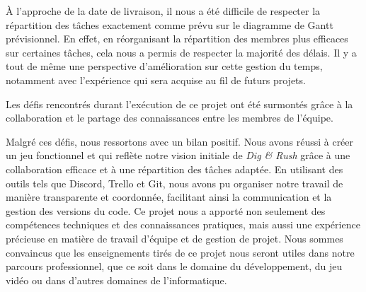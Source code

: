 \documentclass[a4paper,12pt]{article}
\begin{document}
À l’approche de la date de livraison, il nous a été diﬀicile de respecter la répartition des tâches exactement comme prévu sur le diagramme de Gantt prévisionnel.
En effet, en réorganisant la répartition des membres plus eﬀicaces sur certaines tâches, cela nous a permis de respecter la majorité des délais. Il y a tout de même une perspective d’amélioration sur cette gestion du temps, notamment avec l’expérience qui sera acquise au fil de futurs projets.

Les défis rencontrés durant l’exécution de ce projet ont été surmontés grâce à la collaboration et le partage des connaissances entre les membres de l’équipe.

Malgré ces défis, nous ressortons avec un bilan positif. 
Nous avons réussi à créer un jeu fonctionnel et qui reflète notre vision initiale de \textit{Dig \& Rush} grâce à une collaboration efficace et à une répartition des tâches adaptée. 
En utilisant des outils tels que Discord, Trello et Git, nous avons pu organiser notre travail de manière transparente et coordonnée, facilitant ainsi la communication et la gestion des versions du code.
Ce projet nous a apporté non seulement des compétences techniques et des connaissances pratiques, mais aussi une expérience précieuse en matière de travail d’équipe et de gestion de projet. 
Nous sommes convaincus que les enseignements tirés de ce projet nous seront utiles dans notre parcours professionnel, que ce soit dans le domaine du développement, du jeu vidéo ou dans d’autres domaines de l’informatique.
\end{document}

